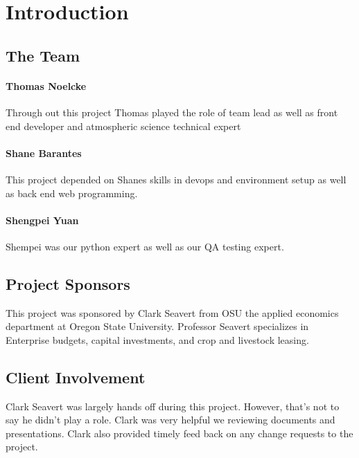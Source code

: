 \documentclass[onecolumn, draftclsnofoot,10pt, compsoc]{article}
\begin{document}
\newpage
{}
\tableofcontents
\newpage
\clearpage

\section{Introduction}

		\subsection{The Team}
		    \paragraph{Thomas Noelcke} Through out this project Thomas played the role of team lead as well as front end developer and atmospheric science technical expert
		    
		    \paragraph{Shane Barantes} This project depended on Shanes skills in devops and environment setup as well as back end web programming.\\
		    
		    \paragraph{Shengpei Yuan} Shempei was our python expert as well as our QA testing expert.\\
		    
		\subsection{Project Sponsors}
		    This project was sponsored by Clark Seavert from OSU the applied economics department at Oregon State University. Professor Seavert specializes in Enterprise budgets, capital investments, and crop and livestock leasing.\\
		    
        \subsection{Client Involvement} 
            Clark Seavert was largely hands off during this project. However, that's not to say he didn't play a role. Clark was very helpful we reviewing documents and presentations. Clark also provided timely feed back on any change requests to the project.\\
            
\end{document}
